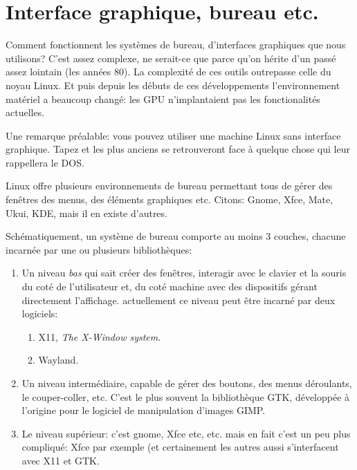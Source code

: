 \section{Interface graphique, bureau etc.}
Comment fonctionnent les systèmes de bureau, d'interfaces graphiques
que nous utilisons? C'est assez complexe, ne serait-ce que parce qu'on
hérite d'un passé assez lointain (les années 80). La complexité de ces
outils outrepasse celle du noyau Linux. Et puis depuis les débuts de
ces développements l'environnement matériel a beaucoup changé: les GPU
n'implantaient pas les fonctionalités actuelles. 


Une remarque préalable: vous pouvez utiliser une machine Linux sans
interface graphique. Tapez  et les plus anciens se
retrouveront face à quelque chose qui leur rappellera le DOS.

Linux offre plusieurs environnements de bureau permettant tous de
gérer des fenêtres des menus, des éléments graphiques etc. Citons:
Gnome, Xfce, Mate, Ukui, KDE, mais il en existe d'autres.

Schématiquement, un système de bureau comporte au moins 3 couches,
chacune incarnée par une ou plusieurs bibliothèques:

\begin{enumerate}
\item Un niveau \textsl{bas} qui sait créer des fenêtres, interagir
  avec le clavier et la souris du coté de l'utilisateur et, du coté
  machine avec des dispositifs gérant directement
  l'affichage. actuellement ce
  niveau peut être incarné par deux logiciels:

  \begin{enumerate}
  \item X11, \textsl{The X-Window system}.
  \item Wayland.
  \end{enumerate}

\item Un niveau intermédiaire, capable de gérer des boutons, des menus
  déroulants, le couper-coller, etc. C'est le plus souvent la
  bibliothèque GTK, développée à l'origine pour le logiciel de
  manipulation d'images GIMP.

\item Le niveau supérieur: c'est gnome, Xfce etc, etc.  mais en fait
  c'est un peu plus compliqué: Xfce par exemple (et certainement les
  autres aussi s'interfacent avec X11 et GTK.
\end{enumerate}

